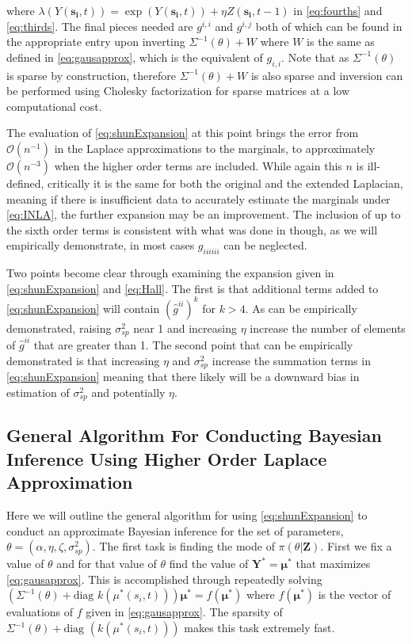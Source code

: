\documentclass[11pt]{isuthesis}
\begin{document}
	where $\lambda(Y(\boldsymbol{s_i},t))=\exp(Y(\boldsymbol{s_i},t))+\eta Z(\boldsymbol{s_i},t-1)$ in \eqref{eq:fourths} and \eqref{eq:thirds}.  The final pieces needed are $g^{i,i}$ and $g^{i,j}$ both of which can be found in the appropriate entry upon inverting $\Sigma^{-1}(\theta)+W$ where $W$ is the same as defined in \eqref{eq:gausapprox}, which is the equivalent of $g_{i,i}$.  Note that as $\Sigma^{-1}(\theta)$ is sparse by construction, therefore $\Sigma^{-1}(\theta)+W$ is also sparse and inversion can be performed using Cholesky factorization for sparse matrices at a low computational cost.
	
	The evaluation of \eqref{eq:shunExpansion} at this point brings the error from $\mathcal{O}(n^{-1})$ in the Laplace approximations to the marginals, to approximately $\mathcal{O}(n^{-3})$ when the higher order terms are included. While again this $n$ is ill-defined, critically it is the same for both the original and the extended Laplacian, meaning if there is insufficient data to accurately estimate the marginals under \eqref{eq:INLA}, the further expansion may be an improvement.  The inclusion of up to the sixth order terms is consistent with what was done in \cite{raudenbush2000maximum} though, as we will empirically demonstrate, in most cases $g_{iiiiii}$ can be neglected.
	
	Two points become clear through examining the expansion given in \eqref{eq:shunExpansion} and \eqref{eq:Hall}.  The first is that additional terms added to \eqref{eq:shunExpansion} will contain $(\hat{g}^{ii})^k$ for $k>4$.  As can be empirically demonstrated, raising $\sigma^2_{sp}$ near 1 and increasing $\eta$ increase the number of elements of $\hat{g}^{ii}$ that are greater than 1.  The second point that can be empirically demonstrated is that increasing $\eta$ and $\sigma_{sp}^2$ increase the summation terms in \eqref{eq:shunExpansion} meaning that there likely will be a downward bias in estimation of $\sigma_{sp}^2$ and potentially $\eta$.   
	
	\subsection{General Algorithm For Conducting Bayesian Inference Using Higher Order Laplace Approximation}
	
	Here we will outline the general algorithm for using \eqref{eq:shunExpansion} to conduct an approximate Bayesian inference for the set of parameters, $\theta=\left(\alpha,\eta,\zeta,\sigma_{sp}^2\right)$.  The first task is finding the mode of $\pi(\theta|\boldsymbol{Z})$.  First we fix a value of $\theta$ and for that value of $\theta$ find the value of $\boldsymbol{Y}^*=\boldsymbol{\mu}^*$ that maximizes \eqref{eq:gausapprox}.  This is accomplished through repeatedly solving $\left(\Sigma^{-1}(\theta)+\text{diag }k(\mu^*(s_i,t))\right)\boldsymbol{\mu}^*=f(\boldsymbol{\mu}^*)$ where $f(\boldsymbol{\mu^*})$ is the vector of evaluations of $f$ given in \eqref{eq:gausapprox}.  The sparsity of $\Sigma^{-1}(\theta)+\text{diag }(k(\mu^*(s_i,t)))$ makes this task extremely fast.
	
\end{document}
